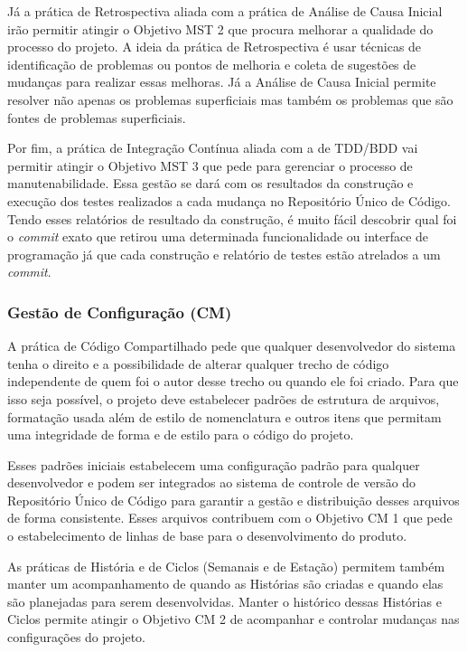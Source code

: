 Já a prática de Retrospectiva aliada com a prática de Análise de Causa
Inicial irão permitir atingir o Objetivo MST 2 que procura melhorar a
qualidade do processo do projeto. A ideia da prática de Retrospectiva
\cite{Derby2006} é usar técnicas de identificação de problemas ou
pontos de melhoria e coleta de sugestões de mudanças para realizar
essas melhoras. Já a Análise de Causa Inicial permite resolver não
apenas os problemas superficiais mas também os problemas que são
fontes de problemas superficiais.

Por fim, a prática de Integração Contínua aliada com a de TDD/BDD vai
permitir atingir o Objetivo MST 3 que pede para gerenciar o processo
de manutenabilidade. Essa gestão se dará com os resultados da
construção e execução dos testes realizados a cada mudança no
Repositório Único de Código. Tendo esses relatórios de resultado da
construção, é muito fácil descobrir qual foi o \textit{commit} exato
que retirou uma determinada funcionalidade ou interface de programação
já que cada construção e relatório de testes estão atrelados a um
\textit{commit}.

\subsubsection{Gestão de Configuração (CM)}
\label{sec:+cm}

A prática de Código Compartilhado pede que qualquer desenvolvedor do
sistema tenha o direito e a possibilidade de alterar qualquer trecho
de código independente de quem foi o autor desse trecho ou quando ele
foi criado. Para que isso seja possível, o projeto deve estabelecer
padrões de estrutura de arquivos, formatação usada além de estilo de
nomenclatura e outros itens que permitam uma integridade de forma e de
estilo para o código do projeto.

Esses padrões iniciais estabelecem uma configuração padrão para
qualquer desenvolvedor e podem ser integrados ao sistema de controle
de versão do Repositório Único de Código para garantir a gestão e
distribuição desses arquivos de forma consistente. Esses arquivos
contribuem com o Objetivo CM 1 que pede o estabelecimento de linhas de
base para o desenvolvimento do produto.

As práticas de História e de Ciclos (Semanais e de Estação) permitem
também manter um acompanhamento de quando as Histórias são criadas e
quando elas são planejadas para serem desenvolvidas. Manter o
histórico dessas Histórias e Ciclos permite atingir o Objetivo CM 2 de
acompanhar e controlar mudanças nas configurações do projeto.

